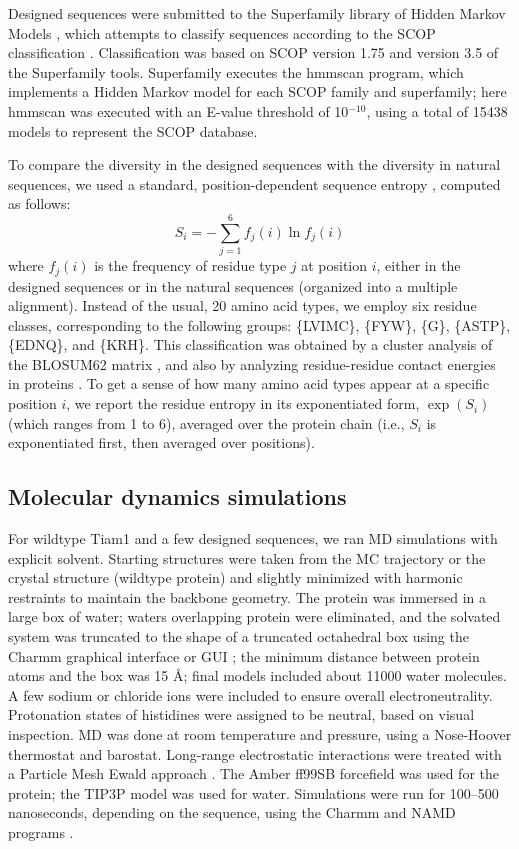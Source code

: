 \documentclass[12pt]{article}
\begin{document}
Designed sequences were submitted to the Superfamily library of Hidden Markov Models \cite{Gough01,Wilson07},
which attempts to classify sequences according to the SCOP classification \cite{Andreeva04}. Classification was
based on SCOP version 1.75 and version 3.5 of the Superfamily tools. Superfamily executes the hmmscan program,
which implements a Hidden Markov model for each SCOP family and superfamily; here hmmscan was executed with an
E-value threshold of 10$^{-10}$, using a total of 15438 models to represent the SCOP database.

To compare the diversity in the designed sequences with the diversity in natural sequences, we used a standard,
position-dependent sequence entropy \cite{DurbinBK}, computed as follows:
\begin{equation} \label{eq:entropy}
S_i = - \sum_{j=1}^6 f_j (i) \ln f_j (i)
\end{equation}
where $f_j(i)$ is the frequency of residue type $j$ at position $i$, either in the designed sequences or in the
natural sequences (organized into a multiple alignment). Instead of the usual, 20 amino acid types, we employ
six residue classes, corresponding to the following groups: \{LVIMC\}, \{FYW\}, \{G\}, \{ASTP\}, \{EDNQ\}, and
\{KRH\}. This classification was obtained by a cluster analysis of the BLOSUM62 matrix \cite{Murphy02}, and also
by analyzing residue-residue contact energies in proteins \cite{Launay07}. To get a sense of how many amino acid
types appear at a specific position $i$, we report the residue entropy in its exponentiated form, $\exp(S_i)$
(which ranges from 1 to 6), averaged over the protein chain (i.e., $S_i$ is exponentiated first, then averaged
over positions).

\subsection{Molecular dynamics simulations}
For wildtype Tiam1 and a few designed sequences, we ran MD simulations with explicit solvent. Starting structures were
taken from the MC trajectory or the crystal structure (wildtype protein) and slightly minimized with harmonic restraints
to maintain the backbone geometry. The protein was immersed in a large box of water; waters overlapping protein were
eliminated, and the solvated system was truncated to the shape of a truncated octahedral box using the Charmm graphical
interface or GUI \cite{Jo08}; the minimum distance between protein atoms and the box was 15 {\AA}; final models included
about 11000 water molecules. A few sodium or chloride ions were included to ensure overall electroneutrality. Protonation
states of histidines were assigned to be neutral, based on visual inspection. MD was done at room temperature and pressure,
using a Nose-Hoover thermostat and barostat. Long-range electrostatic interactions were treated with a Particle Mesh Ewald
approach \cite{DardenBK}. The Amber ff99SB forcefield was used for the protein; the TIP3P model \cite{Jorgensen83} was
used for water. Simulations were run for 100--500 nanoseconds, depending on the sequence, using the Charmm and NAMD programs
\cite{Brooks09,NAMD}.
\end{document}
